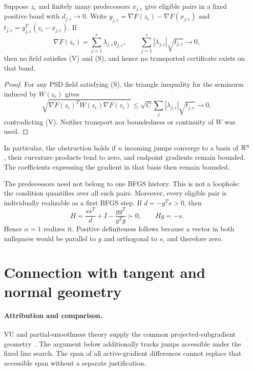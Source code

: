 \begin{proposition}\label{G:prop:star}
Suppose $z_\epsilon$ and finitely many predecessors $x_{j,\epsilon}$ give eligible pairs in a fixed positive band with $d_{j,\epsilon}\to0$. Write $y_{j,\epsilon}=\nabla F(z_\epsilon)-\nabla F(x_{j,\epsilon})$ and $t_{j,\epsilon}=y_{j,\epsilon}^T(z_\epsilon-x_{j,\epsilon})$. If
\[
 \nabla F(z_\epsilon)=\sum_{j=1}^r\lambda_{j,\epsilon}y_{j,\epsilon},
 \qquad
 \sum_{j=1}^r|\lambda_{j,\epsilon}|\sqrt{t_{j,\epsilon}}\longrightarrow0,
\]
then no field satisfies (V) and (S), and hence no transported certificate exists on that band.
\end{proposition}
\begin{proof}
For any PSD field satisfying (S), the triangle inequality for the seminorm induced by $W(z_\epsilon)$ gives
\[
 \sqrt{\nabla F(z_\epsilon)^TW(z_\epsilon)\nabla F(z_\epsilon)}
 \le\sqrt C\sum_j|\lambda_{j,\epsilon}|\sqrt{t_{j,\epsilon}}\to0,
\]
contradicting (V). Neither transport nor boundedness or continuity of $W$ was used.
\end{proof}
In particular, the obstruction holds if $n$ incoming jumps converge to a basis of $\mathbb R^n$, their curvature products tend to zero, and endpoint gradients remain bounded. The coefficients expressing the gradient in that basis then remain bounded.

The predecessors need not belong to one BFGS history. This is not a loophole: the condition quantifies over all such pairs. Moreover, every eligible pair is individually realizable as a first BFGS step. If $d=-g^Ts>0$, then
\[
 H=\frac{ss^T}{d}+I-\frac{gg^T}{g^Tg}\succ0,\qquad Hg=-s.
\]
Hence $\alpha=1$ realizes it. Positive definiteness follows because a vector in both nullspaces would be parallel to $g$ and orthogonal to $s$, and therefore zero.


\setcounter{section}{3}
\setcounter{theorem}{0}
\setcounter{equation}{4}
\section{Connection with tangent and normal geometry}
\paragraph{Attribution and comparison.}
VU and partial-smoothness theory supply the common projected-subgradient geometry~\cite{geom_Lewis2002,LL}. The argument below additionally tracks jumps accessible under the fixed line search. The span of all active-gradient differences cannot replace that accessible span without a separate justification.

